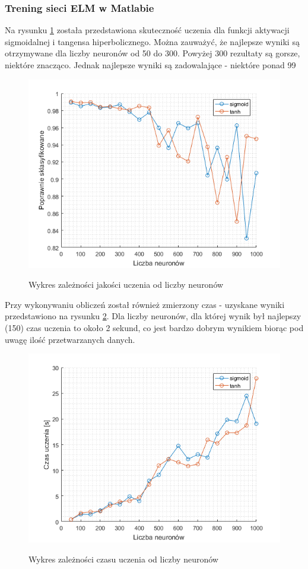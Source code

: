 \documentclass{article}
\begin{document}
\subsubsection{Trening sieci ELM w Matlabie}
Na rysunku \ref{dota_liczba_neuronow} została przedstawiona skuteczność uczenia dla funkcji aktywacji sigmoidalnej i tangensa hiperbolicznego.
Można zauważyć, że najlepsze wyniki są otrzymywane dla liczby neuronów od 50 do 300.
Powyżej 300 rezultaty są gorsze, niektóre znacząco.
Jednak najlepsze wyniki są zadowalające - niektóre ponad 99%
\begin{figure}[H]
\centering
\includegraphics[width=\textwidth]{dota_liczba_neuronow.png}
\label{dota_liczba_neuronow}
\caption{Wykres zależności jakości uczenia od liczby neuronów}
\end{figure}

Przy wykonywaniu obliczeń został również zmierzony czas - uzyskane wyniki przedstawiono na rysunku \ref{dota_wydajnosc}.
Dla liczby neuronów, dla której wynik był najlepszy (150) czas uczenia to około 2 sekund, co jest bardzo dobrym wynikiem biorąc pod uwagę ilość przetwarzanych danych.
\begin{figure}[H]
\centering
\includegraphics[width=\textwidth]{dota_wydajnosc.png}
\label{dota_wydajnosc}
\caption{Wykres zależności czasu uczenia od liczby neuronów}
\end{figure}
\end{document}
